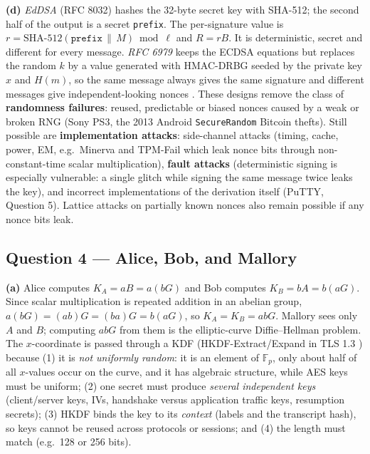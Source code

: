 \documentclass[11pt,a4paper]{article}
\begin{document}
\textbf{(d)} \emph{EdDSA} (RFC 8032) hashes the 32-byte secret key with SHA-512; the second half
of the output is a secret \texttt{prefix}. The per-signature value is
$r = \text{SHA-512}(\texttt{prefix} \,\|\, M) \bmod \ell$ and $R = rB$. It is deterministic,
secret and different for every message. \emph{RFC 6979} keeps the ECDSA equations but replaces the
random $k$ by a value generated with HMAC-DRBG seeded by the private key $x$ and $H(m)$, so the same
message always gives the same signature and different messages give independent-looking nonces
\cite{rfc6979}. These designs remove the class of \textbf{randomness failures}: reused, predictable
or biased nonces caused by a weak or broken RNG (Sony PS3, the 2013 Android \texttt{SecureRandom} Bitcoin
thefts). Still possible are \textbf{implementation attacks}: side-channel attacks (timing, cache,
power, EM, e.g.\ Minerva and TPM-Fail which leak nonce bits through non-constant-time scalar multiplication),
\textbf{fault attacks} (deterministic signing is especially vulnerable: a single glitch while signing
the same message twice leaks the key), and incorrect implementations of the derivation itself (PuTTY,
Question 5). Lattice attacks on partially known nonces also remain possible if any nonce bits leak.

\subsection*{Question 4 --- Alice, Bob, and Mallory}
\textbf{(a)} Alice computes $K_A = aB = a(bG)$ and Bob computes $K_B = bA = b(aG)$. Since scalar
multiplication is repeated addition in an abelian group, $a(bG) = (ab)G = (ba)G = b(aG)$, so
$K_A = K_B = abG$. Mallory sees only $A$ and $B$; computing $abG$ from them is the elliptic-curve
Diffie--Hellman problem. The $x$-coordinate is passed through a KDF (HKDF-Extract/Expand in TLS 1.3
\cite{rfc8446,rfc5869}) because (1) it is \emph{not uniformly random}: it is an element of $\mathbb{F}_p$, only about
half of all $x$-values occur on the curve, and it has algebraic structure, while AES keys must be uniform;
(2) one secret must produce \emph{several independent keys} (client/server keys, IVs, handshake versus
application traffic keys, resumption secrets); (3) HKDF binds the key to its \emph{context} (labels and
the transcript hash), so keys cannot be reused across protocols or sessions; and (4) the length must
match (e.g.\ 128 or 256 bits).
\end{document}
